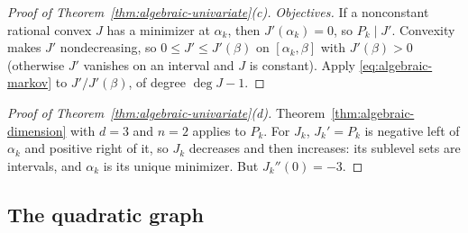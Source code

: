 \begin{proof}[Proof of Theorem~\ref{thm:algebraic-univariate}(c)]
\emph{Objectives.} If a nonconstant rational convex $J$ has a minimizer at
$\alpha_k$, then $J'(\alpha_k)=0$, so $P_k\mid J'$. Convexity makes $J'$
nondecreasing, so $0\le J'\le J'(\beta)$ on $[\alpha_k,\beta]$ with
$J'(\beta)>0$ (otherwise $J'$ vanishes on an interval and $J$ is constant).
Apply \eqref{eq:algebraic-markov} to $J'/J'(\beta)$, of degree $\deg J-1$.
\end{proof}

\begin{proof}[Proof of Theorem~\ref{thm:algebraic-univariate}(d)]
Theorem~\ref{thm:algebraic-dimension} with $d=3$ and $n=2$ applies to $P_k$.
For $J_k$, $J_k'=P_k$ is negative left of $\alpha_k$ and positive right of it,
so $J_k$ decreases and then increases: its sublevel sets are intervals, and
$\alpha_k$ is its unique minimizer. But $J_k''(0)=-3$.
\end{proof}

\subsection{The quadratic graph}
\label{app:algebraic-graph}

